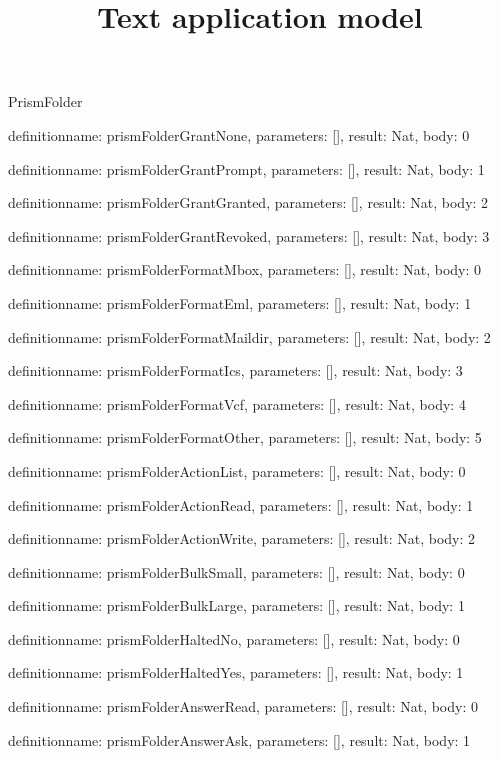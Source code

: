 \begin{lexlean}{PrismFolder}
\title{Text application model}
\begin{semanticmodule}
definition{name: prismFolderGrantNone, parameters: [], result: Nat, body: 0}

definition{name: prismFolderGrantPrompt, parameters: [], result: Nat, body: 1}

definition{name: prismFolderGrantGranted, parameters: [], result: Nat, body: 2}

definition{name: prismFolderGrantRevoked, parameters: [], result: Nat, body: 3}

definition{name: prismFolderFormatMbox, parameters: [], result: Nat, body: 0}

definition{name: prismFolderFormatEml, parameters: [], result: Nat, body: 1}

definition{name: prismFolderFormatMaildir, parameters: [], result: Nat, body: 2}

definition{name: prismFolderFormatIcs, parameters: [], result: Nat, body: 3}

definition{name: prismFolderFormatVcf, parameters: [], result: Nat, body: 4}

definition{name: prismFolderFormatOther, parameters: [], result: Nat, body: 5}

definition{name: prismFolderActionList, parameters: [], result: Nat, body: 0}

definition{name: prismFolderActionRead, parameters: [], result: Nat, body: 1}

definition{name: prismFolderActionWrite, parameters: [], result: Nat, body: 2}

definition{name: prismFolderBulkSmall, parameters: [], result: Nat, body: 0}

definition{name: prismFolderBulkLarge, parameters: [], result: Nat, body: 1}

definition{name: prismFolderHaltedNo, parameters: [], result: Nat, body: 0}

definition{name: prismFolderHaltedYes, parameters: [], result: Nat, body: 1}

definition{name: prismFolderAnswerRead, parameters: [], result: Nat, body: 0}

definition{name: prismFolderAnswerAsk, parameters: [], result: Nat, body: 1}


\end{semanticmodule}
\end{lexlean}
